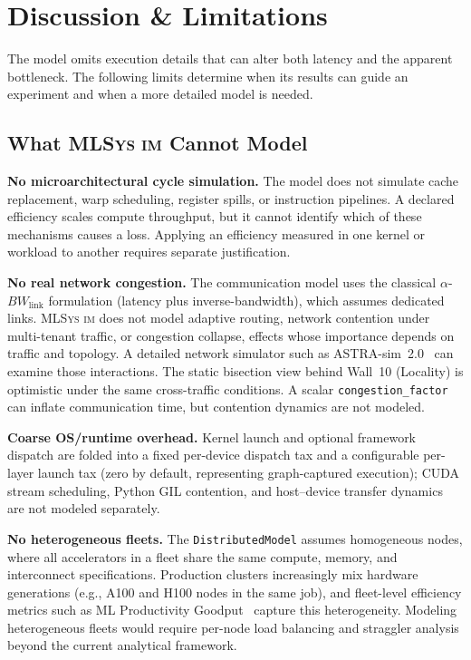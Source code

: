 \documentclass[10pt,twocolumn]{article}
\newcommand{\mlsysim}{\mbox{\textsc{MLSys}\,\textperiodcentered\,\textsc{im}}\xspace}
\begin{document}
\section{Discussion \& Limitations}
\label{sec:discussion}

The model omits execution details that can alter both latency and the apparent bottleneck. The following limits determine when its results can guide an experiment and when a more detailed model is needed.

\subsection{What \mlsysim Cannot Model}

\textbf{No microarchitectural cycle simulation.} The model does not simulate cache replacement, warp scheduling, register spills, or instruction pipelines. A declared efficiency scales compute throughput, but it cannot identify which of these mechanisms causes a loss. Applying an efficiency measured in one kernel or workload to another requires separate justification.

\textbf{No real network congestion.} The communication model uses the classical $\alpha$-$BW_{\text{link}}$ formulation (latency plus inverse-bandwidth), which assumes dedicated links. \mlsysim does not model adaptive routing, network contention under multi-tenant traffic, or congestion collapse, effects whose importance depends on traffic and topology. A detailed network simulator such as ASTRA-sim~2.0~\citep{won2023} can examine those interactions. The static bisection view behind Wall~10 (Locality) is optimistic under the same cross-traffic conditions. A scalar \texttt{congestion\_factor} can inflate communication time, but contention dynamics are not modeled.

\textbf{Coarse OS/runtime overhead.} Kernel launch and optional framework dispatch are folded into a fixed per-device dispatch tax and a configurable per-layer launch tax (zero by default, representing graph-captured execution); CUDA stream scheduling, Python GIL contention, and host--device transfer dynamics are not modeled separately.

\textbf{No heterogeneous fleets.} The \texttt{DistributedModel} assumes homogeneous nodes, where all accelerators in a fleet share the same compute, memory, and interconnect specifications. Production clusters increasingly mix hardware generations (e.g., A100 and H100 nodes in the same job), and fleet-level efficiency metrics such as ML Productivity Goodput~\citep{wongpanich2025fleet} capture this heterogeneity. Modeling heterogeneous fleets would require per-node load balancing and straggler analysis beyond the current analytical framework.
\end{document}
